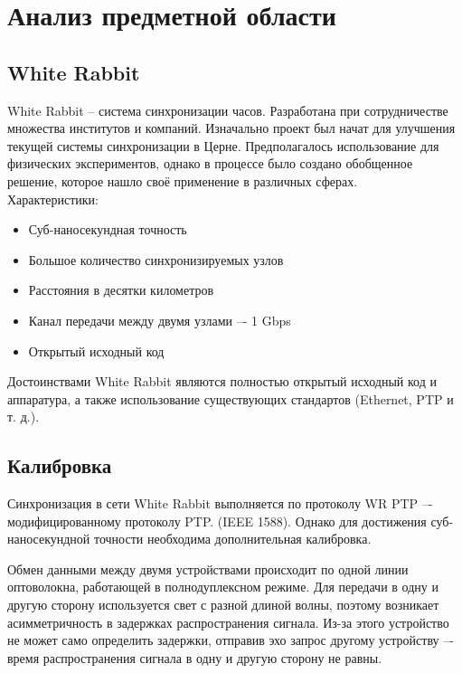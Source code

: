 \chapter{Анализ предметной области} \label{ch1}

\section{White Rabbit} \label{ch1:sec1}

White Rabbit -- система синхронизации часов. Разработана при сотрудничестве множества
институтов и компаний. Изначально проект был начат для улучшения текущей системы синхронизации в Церне.
Предполагалось использование для физических экспериментов, однако в процессе было создано обобщенное решение,
которое нашло своё применение в различных сферах.\\

\noindent Характеристики:

\begin{itemize}
	\item Суб-наносекундная точность
	\item Большое количество синхронизируемых узлов
	\item Расстояния в десятки километров
	\item Канал передачи между двумя узлами –- 1 Gbps
	\item Открытый исходный код\\
\end{itemize}

Достоинствами White Rabbit являются полностью открытый исходный код и аппаратура, а также 
использование существующих стандартов (Ethernet, PTP и т. д.).

\section{Калибровка}

Синхронизация в сети White Rabbit выполняется по протоколу WR PTP –- модифицированному протоколу PTP. (IEEE 1588).
Однако для достижения суб-наносекундной точности необходима дополнительная калибровка.

Обмен данными между двумя устройствами происходит по одной линии оптоволокна, работающей в полнодуплексном режиме.
Для передачи в одну и другую сторону используется свет с разной длиной волны, поэтому возникает асимметричность в
задержках распространения сигнала. Из-за этого устройство не может само определить задержки, отправив эхо запрос
другому устройству –- время распространения сигнала в одну и другую сторону не равны.

